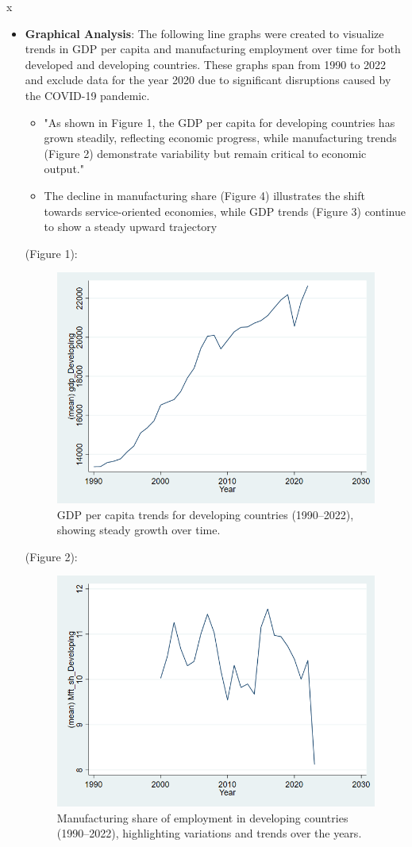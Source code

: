 x\documentclass[12pt]{article}
\begin{document}
\begin{itemize}
    \item \textbf{Graphical Analysis}:  
  The following line graphs were created to visualize trends in GDP per capita and manufacturing employment over time for both developed and developing countries. These graphs span from 1990 to 2022 and exclude data for the year 2020 due to significant disruptions caused by the COVID-19 pandemic.
  
\begin{itemize}
    \item "As shown in Figure 1, the GDP per capita for developing countries has grown steadily, reflecting economic progress, while manufacturing trends (Figure 2) demonstrate variability but remain critical to economic output."
    \item The decline in manufacturing share (Figure 4) illustrates the shift towards service-oriented economies, while GDP trends (Figure 3) continue to show a steady upward trajectory
\end{itemize}


(Figure 1):
\begin{figure}
    \centering
    \includegraphics[width=0.75\linewidth]{391423396-9d8ae4b4-2a48-4b9f-8427-e7c3ebc5fb9f.png}
    \caption{GDP per capita trends for developing countries (1990–2022), showing steady growth over time.}
    \label{fig:enter-label}
\end{figure}

(Figure 2):
\begin{figure}
    \centering
    \includegraphics[width=0.75\linewidth]{391423390-5a4d719e-8e42-4cd2-9850-69f08fac8a68.png}
    \caption{Manufacturing share of employment in developing countries (1990–2022), highlighting variations and trends over the years.}
    \label{fig:enter-label}
\end{figure}


\end{itemize}
\end{document}
